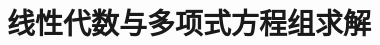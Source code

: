 \documentclass[a4paper]{article}
\title{线性代数与多项式方程组求解}
\date{}
\begin{document}
\maketitle

\tableofcontents
\nocite{adv_alg}\nocite{ideals}\nocite{using}\nocite{lc}\nocite{poly_alg}





\printbibliography
%
\end{document}
